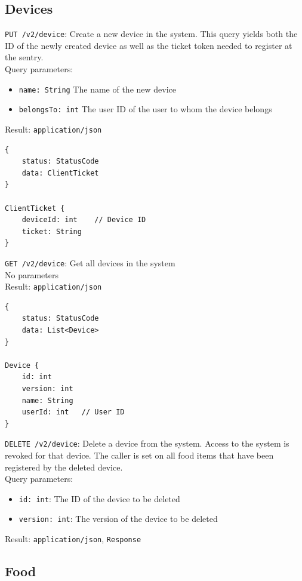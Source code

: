 \documentclass[12pt]{report}
\begin{document}
\subsection{Devices}

\texttt{PUT /v2/device}: Create a new device in the system. This query yields
both the ID of the newly created device as well as the ticket token needed to
register at the sentry.\\
Query parameters:
\begin{itemize}
\item \texttt{name: String} The name of the new device
\item \texttt{belongsTo: int} The user ID of the user to whom the device belongs
\end{itemize}
Result: \texttt{application/json}
\begin{lstlisting}
{
    status: StatusCode
    data: ClientTicket
}

ClientTicket {
    deviceId: int    // Device ID
    ticket: String
}
\end{lstlisting}\vspace{7mm}
\texttt{GET /v2/device}: Get all devices in the system\\
No parameters\\
Result: \texttt{application/json}
\begin{lstlisting}
{
    status: StatusCode
    data: List<Device>
}

Device {
    id: int
    version: int
    name: String
    userId: int   // User ID
}
\end{lstlisting}\vspace{7mm}
\texttt{DELETE /v2/device}: Delete a device from the system.
Access to the system is revoked for that device. The caller
is set on all food items that have been registered by the deleted
device.\\
Query parameters:
\begin{itemize}
\item \texttt{id: int}: The ID of the device to be deleted
\item \texttt{version: int}: The version of the device to be deleted
\end{itemize}
Result: \texttt{application/json}, \texttt{Response}

\subsection{Food}
\end{document}
